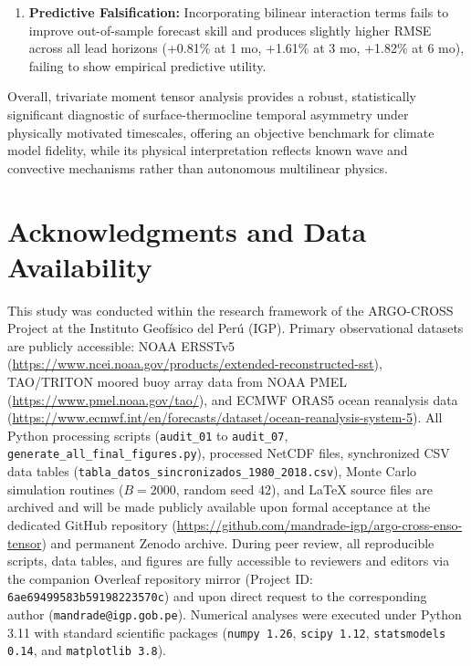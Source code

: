 \documentclass[11pt,a4paper]{article}
\begin{document}
\begin{enumerate}
    \item \textbf{Predictive Falsification:} Incorporating bilinear interaction terms fails to improve out-of-sample forecast skill and produces slightly higher RMSE across all lead horizons (+0.81\% at 1 mo, +1.61\% at 3 mo, +1.82\% at 6 mo), failing to show empirical predictive utility.
\end{enumerate}

Overall, trivariate moment tensor analysis provides a robust, statistically significant diagnostic of surface-thermocline temporal asymmetry under physically motivated timescales, offering an objective benchmark for climate model fidelity, while its physical interpretation reflects known wave and convective mechanisms rather than autonomous multilinear physics.

\section*{Acknowledgments and Data Availability}
This study was conducted within the research framework of the ARGO-CROSS Project at the Instituto Geof\'isico del Per\'u (IGP). Primary observational datasets are publicly accessible: NOAA ERSSTv5 (\url{https://www.ncei.noaa.gov/products/extended-reconstructed-sst}), TAO/TRITON moored buoy array data from NOAA PMEL (\url{https://www.pmel.noaa.gov/tao/}), and ECMWF ORAS5 ocean reanalysis data (\url{https://www.ecmwf.int/en/forecasts/dataset/ocean-reanalysis-system-5}). All Python processing scripts (\texttt{audit\_01} to \texttt{audit\_07}, \texttt{generate\_all\_final\_figures.py}), processed NetCDF files, synchronized CSV data tables (\texttt{tabla\_datos\_sincronizados\_1980\_2018.csv}), Monte Carlo simulation routines ($B=2000$, random seed 42), and LaTeX source files are archived and will be made publicly available upon formal acceptance at the dedicated GitHub repository (\url{https://github.com/mandrade-igp/argo-cross-enso-tensor}) and permanent Zenodo archive. During peer review, all reproducible scripts, data tables, and figures are fully accessible to reviewers and editors via the companion Overleaf repository mirror (Project ID: \texttt{6ae69499583b59198223570c}) and upon direct request to the corresponding author (\texttt{mandrade@igp.gob.pe}). Numerical analyses were executed under Python 3.11 with standard scientific packages (\texttt{numpy 1.26}, \texttt{scipy 1.12}, \texttt{statsmodels 0.14}, and \texttt{matplotlib 3.8}).



\end{document}
